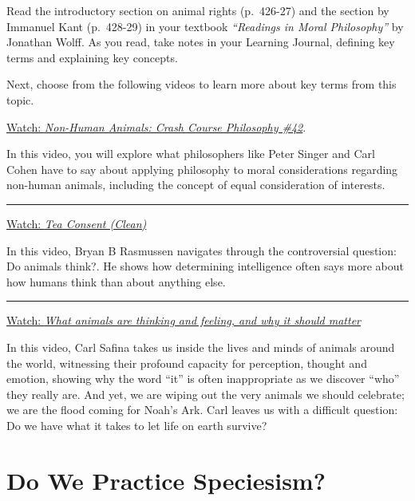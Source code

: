 \documentclass[
]{book}
\begin{document}
\begin{reflect}
Read the introductory section on animal rights (p.~426-27) and the section by Immanuel Kant (p.~428-29) in your textbook \emph{``Readings in Moral Philosophy''} by Jonathan Wolff. As you read, take notes in your Learning Journal, defining key terms and explaining key concepts.

Next, choose from the following videos to learn more about key terms from this topic.

\href{https://www.youtube.com/watch?v=y3-BX-jN_Ac}{Watch: \emph{Non-Human Animals: Crash Course Philosophy \#42}}.

In this video, you will explore what philosophers like Peter Singer and Carl Cohen have to say about applying philosophy to moral considerations regarding non-human animals, including the concept of equal consideration of interests.

\begin{center}\rule{0.5\linewidth}{0.5pt}\end{center}

\href{https://www.youtube.com/watch?v=fGoWLWS4-kU}{Watch: \emph{Tea Consent (Clean)}}

In this video, Bryan B Rasmussen navigates through the controversial question: Do animals think?. He shows how determining intelligence often says more about how humans think than about anything else.

\begin{center}\rule{0.5\linewidth}{0.5pt}\end{center}

\href{https://www.youtube.com/watch?v=-wkdH_wluhw}{Watch: \emph{What animals are thinking and feeling, and why it should matter}}

In this video, Carl Safina takes us inside the lives and minds of animals around the world, witnessing their profound capacity for perception, thought and emotion, showing why the word ``it'' is often inappropriate as we discover ``who'' they really are. And yet, we are wiping out the very animals we should celebrate; we are the flood coming for Noah's Ark. Carl leaves us with a difficult question: Do we have what it takes to let life on earth survive?
\end{reflect}

\hypertarget{do-we-practice-speciesism}{%
\section{Do We Practice Speciesism?}\label{do-we-practice-speciesism}}
\end{document}
